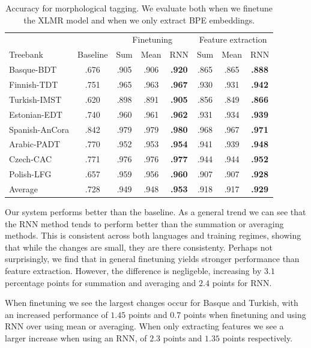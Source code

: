 \documentclass[11pt]{article}
\begin{document}
	\begin{table} %
	\centering
	\begin{tabular}{l|c|ccc|ccc}
		& & \multicolumn{3}{c}{Finetuning} & \multicolumn{3}{c}{Feature extraction} \\
		Treebank & Baseline & Sum & Mean & RNN & Sum & Mean & RNN \\
		\hline
        Basque-BDT      & .676 & .905 & .906 & \textbf{.920} & .865 & .865 & \textbf{.888} \\
		Finnish-TDT     & .751 & .965 & .963 & \textbf{.967} & .930 & .931 & \textbf{.942} \\ 
		Turkish-IMST    & .620 & .898 & .891 & \textbf{.905} & .856 & .849 & \textbf{.866}\\
		Estonian-EDT    & .740 & .960 & .961 & \textbf{.962} & .931 & .934 & \textbf{.939} \\
		Spanish-AnCora  & .842 & .979 & .979 & \textbf{.980} & .968 & .967 & \textbf{.971} \\
		Arabic-PADT     & .770 & .952 & .953 & \textbf{.954} & .941 & .939 & \textbf{.948} \\
		Czech-CAC       & .771 & .976 & .976 & \textbf{.977} & .944 & .944 & \textbf{.952} \\
		Polish-LFG      & .657 & .959 & .956 & \textbf{.960} & .907 & .907 & \textbf{.928} \\
        \hline
        Average         & .728 & .949 & .948 & \textbf{.953} & .918 & .917 & \textbf{.929} \\
	\end{tabular}
	\caption{\label{tab:results_tokens} Accuracy for morphological tagging. We evaluate both when we finetune the XLMR model and when we only extract BPE embeddings.}
	\end{table}

        Our system performs better than the baseline. As a
     general trend we can see that the RNN method tends to perform
     better than the summation or averaging methods. This is
     consistent across both languages and training regimes, showing
     that while the changes are small, they are there consistenty.
            Perhaps not surprisingly, we find that in general
     finetuning yields stronger performance than feature
     extraction. However, the difference is negligeble, increasing by
     $3.1$ percentage points for summation and averaging and $2.4$
     points for RNN.

     When finetuning we see the largest changes occur for Basque and
     Turkish, with an increased performance of $1.45$ points and $0.7$
     points when finetuning and using RNN over using mean or
     averaging. When only extracting features we see a larger
     increase when using an RNN, of $2.3$ points and $1.35$ points
     respectively.
\end{document}
